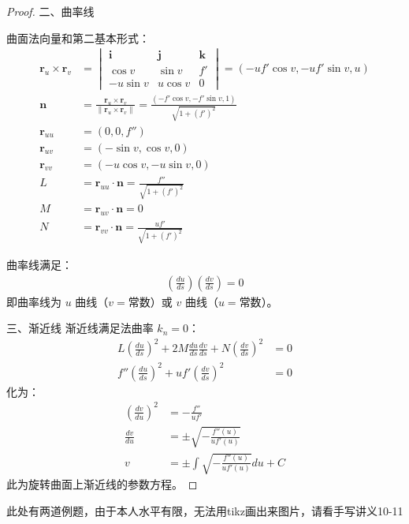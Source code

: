 \documentclass[lang=cn,10pt,thmcnt=section]{elegantbook}
\begin{document}
\begin{proof}
二、曲率线

曲面法向量和第二基本形式：
\begin{align*}
\mathbf{r}_u \times \mathbf{r}_v &= 
\begin{vmatrix}
\mathbf{i} & \mathbf{j} & \mathbf{k} \\
\cos v & \sin v & f' \\
-u \sin v & u \cos v & 0
\end{vmatrix} 
= (-u f' \cos v, -u f' \sin v, u) \\
\mathbf{n} &= \frac{\mathbf{r}_u \times \mathbf{r}_v}{\|\mathbf{r}_u \times \mathbf{r}_v\|} 
= \frac{(-f' \cos v, -f' \sin v, 1)}{\sqrt{1 + (f')^2}} \\
\mathbf{r}_{uu} &= (0, 0, f'') \\
\mathbf{r}_{uv} &= (-\sin v, \cos v, 0) \\
\mathbf{r}_{vv} &= (-u \cos v, -u \sin v, 0) \\
L &= \mathbf{r}_{uu} \cdot \mathbf{n} = \frac{f''}{\sqrt{1 + (f')^2}} \\
M &= \mathbf{r}_{uv} \cdot \mathbf{n} = 0 \\
N &= \mathbf{r}_{vv} \cdot \mathbf{n} = \frac{u f'}{\sqrt{1 + (f')^2}}
\end{align*}


曲率线满足：
\begin{align*}
\left( \frac{du}{ds} \right) \left( \frac{dv}{ds} \right) = 0
\end{align*}
即曲率线为 \(u\) 曲线（\(v = \text{常数}\)）或 \(v\) 曲线（\(u = \text{常数}\)）。

三、渐近线
渐近线满足法曲率 \(k_n = 0\)：
\begin{align*}
L \left( \frac{du}{ds} \right)^2 + 2M \frac{du}{ds} \frac{dv}{ds} + N \left( \frac{dv}{ds} \right)^2 &= 0 \\
f'' \left( \frac{du}{ds} \right)^2 + u f' \left( \frac{dv}{ds} \right)^2 &= 0
\end{align*}
化为：
\begin{align*}
\left( \frac{dv}{du} \right)^2 &= -\frac{f''}{u f'} \\
\frac{dv}{du} &= \pm \sqrt{ -\frac{f''(u)}{u f'(u)} } \\
v &= \pm \int \sqrt{ -\frac{f''(u)}{u f'(u)} }  du + C
\end{align*}
此为旋转曲面上渐近线的参数方程。
\end{proof}

此处有两道例题，由于本人水平有限，无法用tikz画出来图片，请看手写讲义10-11
\end{document}
